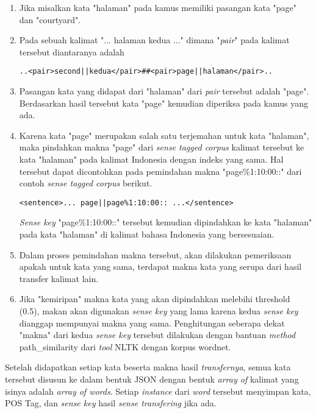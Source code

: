 \begin{enumerate}
	\item Jika misalkan kata "halaman" pada kamus memiliki pasangan kata "page" dan "courtyard".
	\item Pada sebuah kalimat "... halaman kedua ..." dimana "\textit{pair}" pada kalimat tersebut diantaranya adalah
	\begin{lstlisting}[backgroundcolor = \color{white}]
	..<pair>second||kedua</pair>##<pair>page||halaman</pair>..
	\end{lstlisting}
	\item Pasangan kata yang didapat dari "halaman" dari \textit{pair} tersebut adalah "page". Berdasarkan hasil tersebut kata "page" kemudian diperiksa pada kamus yang ada.
	\item Karena kata "page" merupakan salah satu terjemahan untuk kata "halaman", maka pindahkan makna "page" dari \textit{sense tagged corpus} kalimat tersebut ke kata "halaman" pada kalimat Indonesia dengan indeks yang sama. Hal tersebut dapat dicontohkan pada pemindahan makna "page\%1:10:00::" dari contoh \textit{sense tagged corpus} berikut.
	\begin{lstlisting}[backgroundcolor = \color{white}]
	<sentence>... page||page%1:10:00:: ...</sentence>
	\end{lstlisting}
	\textit{Sense key} "page\%1:10:00::" tersebut kemudian dipindahkan ke kata "halaman" pada kata "halaman" di kalimat bahasa Indonesia yang bersesuaian.
	\item Dalam proses pemindahan makna tersebut, akan dilakukan pemeriksaan apakah untuk kata yang sama, terdapat makna kata yang serupa dari hasil transfer kalimat lain.
	\item Jika "kemiripan" makna kata yang akan dipindahkan melebihi threshold (0.5), makan akan digunakan \textit{sense key} yang lama karena kedua \textit{sense key} dianggap mempunyai makna yang sama. Penghitungan seberapa dekat "makna" dari kedua \textit{sense key} tersebut dilakukan dengan bantuan \textit{method} path\_similarity dari \textit{tool} NLTK dengan korpus wordnet.
\end{enumerate}

Setelah didapatkan setiap kata beserta makna hasil \textit{transfernya}, semua kata tersebut disusun ke dalam bentuk JSON dengan bentuk \textit{array of} kalimat yang isinya adalah \textit{array of words}. Setiap \textit{instance} dari \textit{word} tersebut menyimpan kata, POS Tag, dan \textit{sense key} hasil \textit{sense transfering} jika ada.
